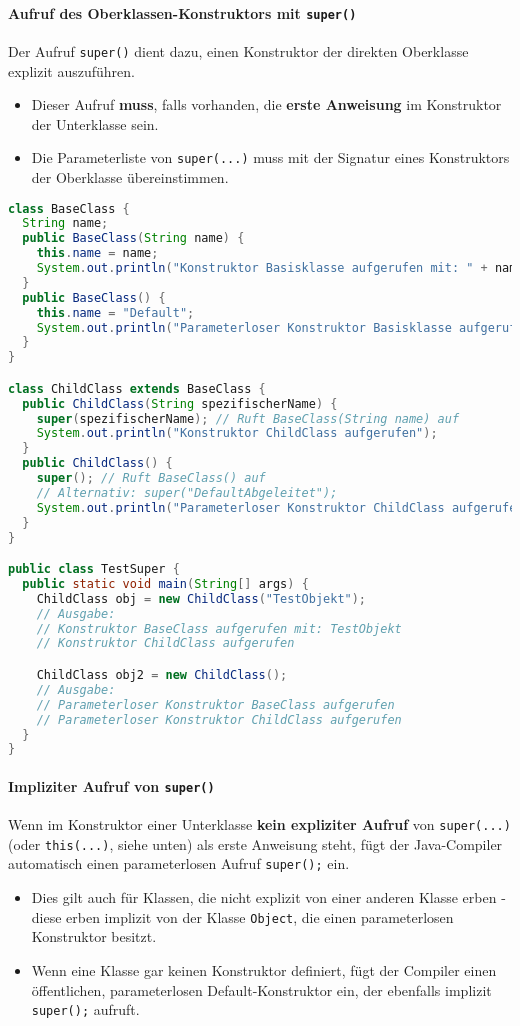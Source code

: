 \paragraph{Aufruf des Oberklassen-Konstruktors mit \texttt{super()}}
Der Aufruf \texttt{super()} dient dazu, einen Konstruktor der direkten Oberklasse explizit auszuführen.
\begin{itemize}
    \item Dieser Aufruf \textbf{muss}, falls vorhanden, die \textbf{erste Anweisung} im Konstruktor der Unterklasse sein.
    \item Die Parameterliste von \texttt{super(...)} muss mit der Signatur eines Konstruktors der Oberklasse übereinstimmen.
\end{itemize}

\begin{lstlisting}[language=Java, caption={Expliziter Aufruf des Oberklassen-Konstruktors via \texttt{super()}}]
class BaseClass {
  String name;
  public BaseClass(String name) {
    this.name = name;
    System.out.println("Konstruktor Basisklasse aufgerufen mit: " + name);
  }
  public BaseClass() {
    this.name = "Default";
    System.out.println("Parameterloser Konstruktor Basisklasse aufgerufen");
  }
}

class ChildClass extends BaseClass {
  public ChildClass(String spezifischerName) {
    super(spezifischerName); // Ruft BaseClass(String name) auf
    System.out.println("Konstruktor ChildClass aufgerufen");
  }
  public ChildClass() {
    super(); // Ruft BaseClass() auf
    // Alternativ: super("DefaultAbgeleitet");
    System.out.println("Parameterloser Konstruktor ChildClass aufgerufen");
  }
}

public class TestSuper {
  public static void main(String[] args) {
    ChildClass obj = new ChildClass("TestObjekt");
    // Ausgabe:
    // Konstruktor BaseClass aufgerufen mit: TestObjekt
    // Konstruktor ChildClass aufgerufen

    ChildClass obj2 = new ChildClass();
    // Ausgabe:
    // Parameterloser Konstruktor BaseClass aufgerufen
    // Parameterloser Konstruktor ChildClass aufgerufen
  }
}
\end{lstlisting}

\paragraph{Impliziter Aufruf von \texttt{super()}}
Wenn im Konstruktor einer Unterklasse \textbf{kein expliziter Aufruf} von \texttt{super(...)} (oder \texttt{this(...)}, siehe unten) 
als erste Anweisung steht, fügt der Java-Compiler automatisch einen parameterlosen Aufruf \texttt{super();} ein.
\begin{itemize}
    \item Dies gilt auch für Klassen, die nicht explizit von einer anderen Klasse erben - diese erben implizit von der 
    Klasse \texttt{Object}, die einen parameterlosen Konstruktor besitzt.
    \item Wenn eine Klasse gar keinen Konstruktor definiert, fügt der Compiler einen öffentlichen, parameterlosen Default-Konstruktor 
    ein, der ebenfalls implizit \texttt{super();} aufruft.
\end{itemize}

